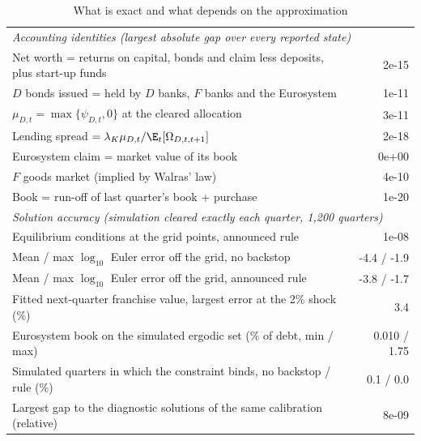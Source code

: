 \begin{table}[htbp]
\centering
\caption{What is exact and what depends on the approximation}
\label{tab:headline-validation}
\small
\begin{tabular}{lr}
\toprule
\multicolumn{2}{l}{\emph{Accounting identities (largest absolute gap over every reported state)}} \\
Net worth = returns on capital, bonds and claim less deposits, plus start-up funds & 2e-15 \\
$D$ bonds issued = held by $D$ banks, $F$ banks and the Eurosystem & 1e-11 \\
$\mu_{D,t}=\max\{\psi_{D,t},0\}$ at the cleared allocation & 3e-11 \\
Lending spread $=\lambda_K\mu_{D,t}/\E_t[\Omega_{D,t,t+1}]$ & 2e-18 \\
Eurosystem claim = market value of its book & 0e+00 \\
$F$ goods market (implied by Walras' law) & 4e-10 \\
Book = run-off of last quarter's book + purchase & 1e-20 \\
\midrule
\multicolumn{2}{l}{\emph{Solution accuracy (simulation cleared exactly each quarter, 1,200 quarters)}} \\
Equilibrium conditions at the grid points, announced rule & 1e-08 \\
Mean / max $\log_{10}$ Euler error off the grid, no backstop & -4.4 / -1.9 \\
Mean / max $\log_{10}$ Euler error off the grid, announced rule & -3.8 / -1.7 \\
Fitted next-quarter franchise value, largest error at the 2\% shock (\%) & 3.4 \\
Eurosystem book on the simulated ergodic set (\% of debt, min / max) & 0.010 / 1.75 \\
Simulated quarters in which the constraint binds, no backstop / rule (\%) & 0.1 / 0.0 \\
Largest gap to the diagnostic solutions of the same calibration (relative) & 8e-09 \\
\bottomrule
\end{tabular}
\end{table}

